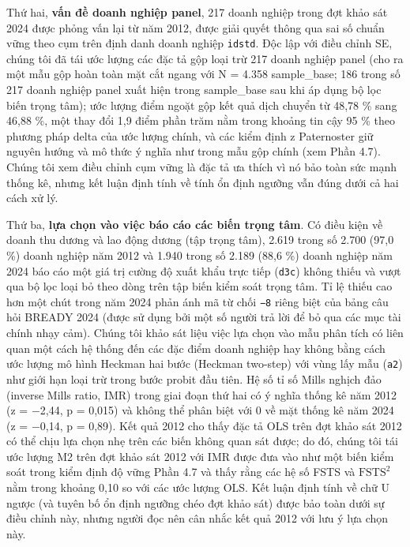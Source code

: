 \documentclass[12pt,a4paper]{article}
\begin{document}
Thứ hai, \textbf{vấn đề doanh nghiệp panel}, 217 doanh nghiệp trong đợt
khảo sát 2024 được phỏng vấn lại từ năm 2012, được giải quyết thông qua
sai số chuẩn vững theo cụm trên định danh doanh nghiệp \texttt{idstd}.
Độc lập với điều chỉnh SE, chúng tôi đã tái ước lượng các đặc tả gộp
loại trừ 217 doanh nghiệp panel (cho ra một mẫu gộp hoàn toàn mặt cắt
ngang với N = 4.358 sample\_base; 186 trong số 217 doanh nghiệp panel
xuất hiện trong sample\_base sau khi áp dụng bộ lọc biến trọng tâm); ước
lượng điểm ngoặt gộp kết quả dịch chuyển từ 48,78 \% sang 46,88 \%, một
thay đổi 1,9 điểm phần trăm nằm trong khoảng tin cậy 95 \% theo phương
pháp delta của ước lượng chính, và các kiểm định z Paternoster giữ
nguyên hướng và mô thức ý nghĩa như trong mẫu gộp chính (xem Phần 4.7).
Chúng tôi xem điều chỉnh cụm vững là đặc tả ưa thích vì nó bảo toàn sức
mạnh thống kê, nhưng kết luận định tính về tính ổn định ngưỡng vẫn đúng
dưới cả hai cách xử lý.

Thứ ba, \textbf{lựa chọn vào việc báo cáo các biến trọng tâm}. Có điều
kiện về doanh thu dương và lao động dương (tập trọng tâm), 2.619 trong
số 2.700 (97,0 \%) doanh nghiệp năm 2012 và 1.940 trong số 2.189 (88,6
\%) doanh nghiệp năm 2024 báo cáo một giá trị cường độ xuất khẩu trực
tiếp (\texttt{d3c}) không thiếu và vượt qua bộ lọc loại bỏ theo dòng
trên tập biến kiểm soát trọng tâm. Tỉ lệ thiếu cao hơn một chút trong
năm 2024 phản ánh mã từ chối \texttt{−8} riêng biệt của bảng câu hỏi
BREADY 2024 (được sử dụng bởi một số người trả lời để bỏ qua các mục tài
chính nhạy cảm). Chúng tôi khảo sát liệu việc lựa chọn vào mẫu phân tích
có liên quan một cách hệ thống đến các đặc điểm doanh nghiệp hay không
bằng cách ước lượng mô hình Heckman hai bước (Heckman two-step) với vùng
lấy mẫu (\texttt{a2}) như giới hạn loại trừ trong bước probit đầu tiên.
Hệ số tỉ số Mills nghịch đảo (inverse Mills ratio, IMR) trong giai đoạn
thứ hai có ý nghĩa thống kê năm 2012 (z = −2,44, p = 0,015) và không thể
phân biệt với 0 về mặt thống kê năm 2024 (z = −0,14, p = 0,89). Kết quả
2012 cho thấy đặc tả OLS trên đợt khảo sát 2012 có thể chịu lựa chọn nhẹ
trên các biến không quan sát được; do đó, chúng tôi tái ước lượng M2
trên đợt khảo sát 2012 với IMR được đưa vào như một biến kiểm soát trong
kiểm định độ vững Phần 4.7 và thấy rằng các hệ số FSTS và
\(\mathrm{FSTS}^2\) nằm trong khoảng 0,10 so với các ước lượng OLS. Kết
luận định tính về chữ U ngược (và tuyên bố ổn định ngưỡng chéo đợt khảo
sát) được bảo toàn dưới sự điều chỉnh này, nhưng người đọc nên cân nhắc
kết quả 2012 với lưu ý lựa chọn này.
\end{document}
